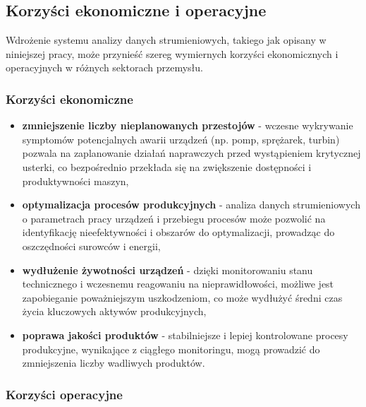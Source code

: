 \subsection{Korzyści ekonomiczne i operacyjne}
\label{subsec:korzysci}

Wdrożenie systemu analizy danych strumieniowych, takiego jak opisany w niniejszej pracy, może przynieść szereg wymiernych korzyści ekonomicznych i operacyjnych w różnych sektorach przemysłu.

\subsubsection{Korzyści ekonomiczne}
\label{subsubsec:korzysci_ekonomiczne}

\begin{itemize}
    \item \textbf{zmniejszenie liczby nieplanowanych przestojów} - wczesne wykrywanie symptomów potencjalnych awarii urządzeń (np. pomp, sprężarek, turbin) pozwala na zaplanowanie działań naprawczych przed wystąpieniem krytycznej usterki, co bezpośrednio przekłada się na zwiększenie dostępności i produktywności maszyn,
    \item \textbf{optymalizacja procesów produkcyjnych} - analiza danych strumieniowych o parametrach pracy urządzeń i przebiegu procesów może pozwolić na identyfikację nieefektywności i obszarów do optymalizacji, prowadząc do oszczędności surowców i energii,
    \item \textbf{wydłużenie żywotności urządzeń} - dzięki monitorowaniu stanu technicznego i wczesnemu reagowaniu na nieprawidłowości, możliwe jest zapobieganie poważniejszym uszkodzeniom, co może wydłużyć średni czas życia kluczowych aktywów produkcyjnych,
    \item \textbf{poprawa jakości produktów} - stabilniejsze i lepiej kontrolowane procesy produkcyjne, wynikające z ciągłego monitoringu, mogą prowadzić do zmniejszenia liczby wadliwych produktów.
\end{itemize}

\subsubsection{Korzyści operacyjne}
\label{subsubsec:korzysci_operacyjne}

